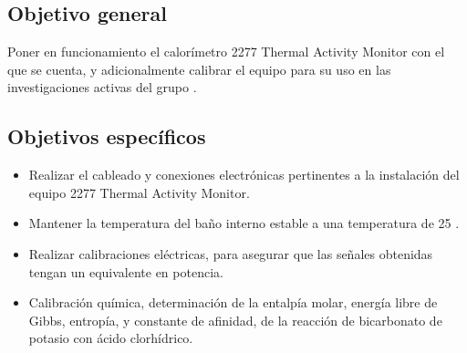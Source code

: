 	\subsection{Objetivo general}
		Poner en funcionamiento el calorímetro 2277 Thermal Activity Monitor con el que se cuenta, y adicionalmente calibrar el equipo para su uso en las investigaciones activas del grupo \groupname.
		
	\subsection{Objetivos específicos}
		\begin{itemize}
			\item Realizar el cableado y conexiones electrónicas pertinentes a la instalaci\'on del equipo 2277 Thermal Activity Monitor.
			\item Mantener la temperatura del ba\~no interno estable a una temperatura de 25 \grad{}.
			\item Realizar calibraciones eléctricas, para asegurar que las señales obtenidas tengan un equivalente en potencia.
			\item Calibración química, determinación de la entalpía molar, energía libre de Gibbs, entropía, y constante de afinidad, de la reacci\'on de bicarbonato de potasio con \'acido clorh\'idrico.
		\end{itemize}
	
